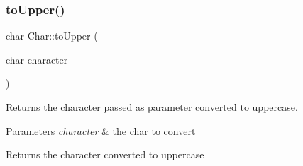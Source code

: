 \subsubsection{\texorpdfstring{toUpper()}{toUpper()}}
{\footnotesize\ttfamily char Char\+::to\+Upper (\begin{DoxyParamCaption}\item[{char}]{character }\end{DoxyParamCaption})\hspace{0.3cm}{\ttfamily [inline]}}



Returns the character passed as parameter converted to uppercase. 


\begin{DoxyParams}{Parameters}
{\em character} & the char to convert \\
\hline
\end{DoxyParams}
\begin{DoxyReturn}{Returns}
the character converted to uppercase 
\end{DoxyReturn}
